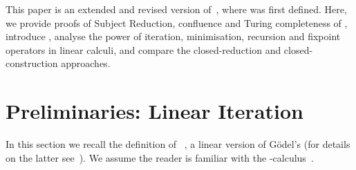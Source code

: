 \documentclass{article}
\begin{document}
This paper is an extended and revised version of~\cite{PPDP2011},
where  was first defined. Here, we provide proofs of Subject
Reduction, confluence and Turing completeness of , introduce
, analyse the power of iteration, minimisation, recursion and
fixpoint operators in linear calculi, and compare the closed-reduction
and closed-construction approaches.






























































































\section{Preliminaries: Linear Iteration}\label{sec:prelim}
In this section we recall the definition of \LLCI~\cite{AlvesS:TCS}, a
linear version of G\"odel's \ST (for details on the latter
see~\cite{GirardJY:prot}). We assume the reader is familiar with the
-calculus~\cite{BarendregtHP:lamcss}.
\end{document}
